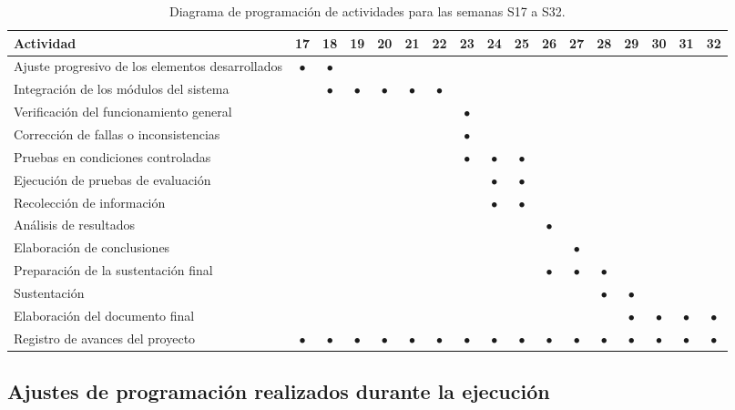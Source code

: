 \documentclass[12pt,letterpaper]{article}
\begin{document}
\begin{table}[H]
    \centering
    \footnotesize
    \setlength{\tabcolsep}{2.4pt}
    \caption{Diagrama de programación de actividades para las semanas S17 a S32.}
    \label{tab:gantt}
    \begin{tabular}{@{}p{5.1cm}cccccccccccccccc@{}}
        \toprule
        \textbf{Actividad} & 17 & 18 & 19 & 20 & 21 & 22 & 23 & 24 & 25 & 26 & 27 & 28 & 29 & 30 & 31 & 32 \\ \midrule
        Ajuste progresivo de los elementos desarrollados & $\bullet$ & $\bullet$ & & & & & & & & & & & & & & \\
        Integración de los módulos del sistema & & $\bullet$ & $\bullet$ & $\bullet$ & $\bullet$ & $\bullet$ & & & & & & & & & & \\
        Verificación del funcionamiento general & & & & & & & $\bullet$ & & & & & & & & & \\
        Corrección de fallas o inconsistencias & & & & & & & $\bullet$ & & & & & & & & & \\
        Pruebas en condiciones controladas & & & & & & & $\bullet$ & $\bullet$ & $\bullet$ & & & & & & & \\
        Ejecución de pruebas de evaluación & & & & & & & & $\bullet$ & $\bullet$ & & & & & & & \\
        Recolección de información & & & & & & & & $\bullet$ & $\bullet$ & & & & & & & \\
        Análisis de resultados & & & & & & & & & & $\bullet$ & & & & & & \\
        Elaboración de conclusiones & & & & & & & & & & & $\bullet$ & & & & & \\
        Preparación de la sustentación final & & & & & & & & & & $\bullet$ & $\bullet$ & $\bullet$ & & & & \\
        Sustentación & & & & & & & & & & & & $\bullet$ & $\bullet$ & & & \\
        Elaboración del documento final & & & & & & & & & & & & & $\bullet$ & $\bullet$ & $\bullet$ & $\bullet$ \\
        Registro de avances del proyecto & $\bullet$ & $\bullet$ & $\bullet$ & $\bullet$ & $\bullet$ & $\bullet$ & $\bullet$ & $\bullet$ & $\bullet$ & $\bullet$ & $\bullet$ & $\bullet$ & $\bullet$ & $\bullet$ & $\bullet$ & $\bullet$ \\ \bottomrule
    \end{tabular}
\end{table}

\subsection{Ajustes de programación realizados durante la ejecución}
\label{sec:ajustes}
\end{document}
